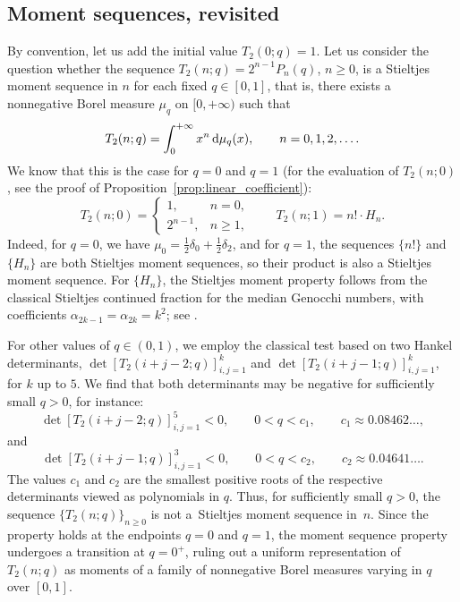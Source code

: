 \documentclass[10pt,a4paper]{amsart}
\numberwithin{equation}{section}
\theoremstyle{definition}
\begin{document}
\subsection{Moment sequences, revisited}\label{subsec:moment_sequences}

By convention, let us add the initial value $T_2(0;q)=1$.
Let us consider the question whether the sequence $T_2(n;q)=2^{n-1}P_n(q)$,
$n\ge0$, is a Stieltjes moment sequence in $n$ for each fixed $q\in[0,1]$, that
is, there exists a nonnegative Borel measure $\mu_q$ on $[0,+\infty)$ such that
\begin{equation*}
	T_2(n;q)  =  \int_{0}^{+\infty} x^n \, {\rm d}\mu_q(x), \qquad n=0,1,2,\dots.
\end{equation*}
We know that this is the case for $q=0$ and $q=1$ (for the evaluation of
$T_2(n;0)$, see the proof of Proposition~\ref{prop:linear_coefficient}):
\begin{equation*}
	T_2(n;0) =\begin{cases}
		1,       & n=0, \\
		2^{n-1}, & n\ge1,
	\end{cases}
	\qquad T_2(n;1) = n!
	\cdot H_n.
\end{equation*}
Indeed, for $q=0$, we have $\mu_0=\frac{1}{2}\delta_0+\frac{1}{2}\delta_2$, and
for $q=1$, the sequences $\{n!\}$ and $\{H_n\}$ are both Stieltjes moment
sequences, so their product is also a Stieltjes moment sequence.
For $\{H_n\}$, the Stieltjes moment property follows from the classical Stieltjes
continued fraction for the median Genocchi numbers, with coefficients
$\alpha_{2k-1}=\alpha_{2k}=k^2$; see \cite{DebSokal2024}.

For other values of $q\in(0,1)$, we employ the classical test based on two
Hankel determinants, $\det[ T_2(i+j-2;q) ]_{i,j=1}^k$ and
$\det[ T_2(i+j-1;q) ]_{i,j=1}^k$, for $k$ up to $5$.
We find that both determinants may be negative for sufficiently small $q>0$, for
instance:
\begin{equation*}
	\det[ T_2(i+j-2;q) ]_{i,j=1}^5<0,\qquad 0<q<c_1, \qquad c_1\approx
	0.08462\dots,
\end{equation*}
and
\begin{equation*}
	\det[ T_2(i+j-1;q) ]_{i,j=1}^3<0,\qquad 0<q<c_2, \qquad c_2\approx
	0.04641\dots.
\end{equation*}
The values $c_1$ and $c_2$ are the smallest positive roots of the respective
determinants viewed as polynomials in $q$.
Thus, for sufficiently small $q>0$, the sequence $\{T_2(n;q)\}_{n\ge0}$ is not a~Stieltjes moment sequence in~$n$.
Since the property holds at the endpoints $q=0$ and $q=1$, the moment sequence
property undergoes a transition at $q=0^+$, ruling out a uniform representation
of~$T_2(n;q)$ as moments of a family of nonnegative Borel measures varying in
$q$ over $[0,1]$.
\end{document}
